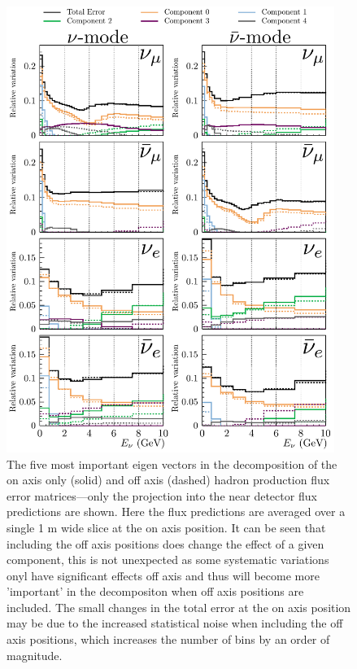 \documentclass{article}
\begin{document}
\begin{figure}
  \centering
  \includegraphics[width=0.95\textwidth]{plots/EvUncerts_oacomp}
  \caption{The five most important eigen vectors in the decomposition of the on axis only (solid) and off axis (dashed) hadron production flux error matrices---only the projection into the near detector flux predictions are shown. Here the flux predictions are averaged over a single 1 m wide slice at the on axis position. It can be seen that including the off axis positions does change the effect of a given component, this is not unexpected as some systematic variations onyl have significant effects off axis and thus will become more 'important' in the decompositon when off axis positions are included. The small changes in the total error at the on axis position may be due to the increased statistical noise when including the off axis positions, which increases the number of bins by an order of magnitude.}
  \label{fig:evfreedom_onaxis_oacomp}
\end{figure}
\end{document}
